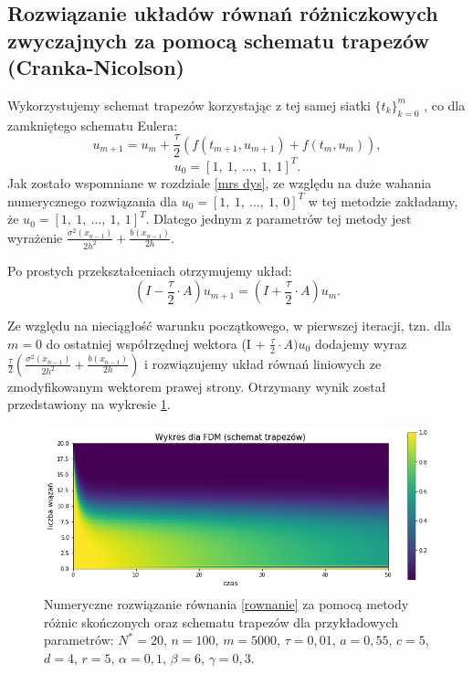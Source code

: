 \documentclass{article}
\begin{document}
\subsection{Rozwiązanie układów równań różniczkowych zwyczajnych za pomocą schematu trapezów (Cranka-Nicolson)} 
Wykorzystujemy schemat trapezów korzystając z tej samej siatki $\{t_k\}_{k=0}^{m}$ , co dla zamkniętego schematu Eulera:
\begin{equation*}
u_{m+1} = u_{m} + \frac{\tau}{2} ( f(t_{m+1}, u_{m+1}) + f(t_{m}, u_{m}) ),
\end{equation*}
\begin{equation*}
u_{0} = [1, \ 1, \ \dots, \ 1, \ 1]^{T}.
\end{equation*}
Jak zostało wspomniane w rozdziale \ref{mrs dys}, ze względu na duże wahania numerycznego rozwiązania dla $u_{0} = [1, \ 1, \ \dots, \ 1, \ 0]^{T}$ w tej metodzie zakładamy, że $u_{0} = [1, \ 1, \ \dots, \ 1, \ 1]^{T}$. Dlatego jednym z parametrów tej metody jest wyrażenie $\frac{\sigma^{2}(x_{n-1})}{2 h^{2}} + \frac{b(x_{n-1})}{2 h}$.

Po prostych przekształceniach otrzymujemy układ:
\begin{equation*}
(I - \frac{\tau}{2} \cdot A)u_{m+1} = (I + \frac{\tau}{2} \cdot A) u_{m}.
\end{equation*}

Ze względu na nieciągłość warunku początkowego, w pierwszej iteracji, tzn. dla $m=0$ do ostatniej współrzędnej wektora (I + $\frac{\tau}{2} \cdot A) u_{0}$ dodajemy wyraz $\frac{\tau}{2}(\frac{\sigma^{2}(x_{n-1})}{2 h^{2}} + \frac{b(x_{n-1})}{2 h})$ i rozwiązujemy układ równań liniowych ze zmodyfikowanym wektorem prawej strony. Otrzymany wynik został przedstawiony na wykresie \ref{mrs trapezy}.
\begin{figure}[h!]
	\centering
	\includegraphics[width=\textwidth]{images/wykres_fdm_trapezy.pdf}
	\caption{Numeryczne rozwiązanie równania \eqref{rownanie} za pomocą metody różnic skończonych oraz schematu trapezów dla przykładowych parametrów: $N^{*}=20$, $n=100$, $m=5000$, $\tau=0,01$, $a=0,55$, $c=5$, $d=4$, $r=5$, $\alpha=0,1$, $\beta=6$, $\gamma=0,3$. }\label{mrs trapezy}
\end{figure}
\end{document}
